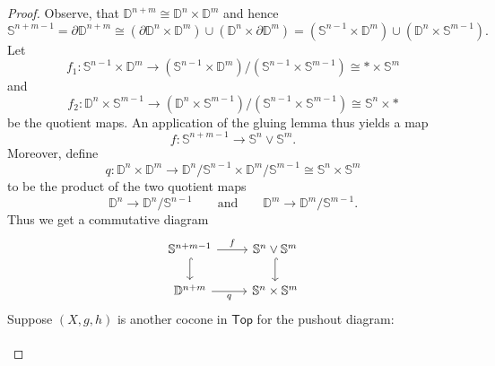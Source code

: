 \begin{proof}
	Observe, that $\mathbb{D}^{n + m} \cong \mathbb{D}^n \times \mathbb{D}^m$ and hence
	\begin{equation*}
		\mathbb{S}^{n + m - 1} = \partial \mathbb{D}^{n + m} \cong (\partial \mathbb{D}^n \times \mathbb{D}^m) \cup (\mathbb{D}^n \times \partial \mathbb{D}^m) = (\mathbb{S}^{n - 1} \times \mathbb{D}^m) \cup (\mathbb{D}^n \times \mathbb{S}^{m - 1}).
	\end{equation*}
	Let 
	\begin{equation*}
		f_1 : \mathbb{S}^{n - 1} \times \mathbb{D}^m \to (\mathbb{S}^{n - 1} \times \mathbb{D}^m) / (\mathbb{S}^{n - 1} \times \mathbb{S}^{m - 1}) \cong \ast \times \mathbb{S}^m
	\end{equation*}
	\noindent and
	\begin{equation*}
		f_2 : \mathbb{D}^n \times \mathbb{S}^{m - 1} \to (\mathbb{D}^n \times \mathbb{S}^{m - 1}) / (\mathbb{S}^{n - 1} \times \mathbb{S}^{m - 1}) \cong \mathbb{S}^n \times \ast
	\end{equation*}
	\noindent be the quotient maps. An application of the gluing lemma thus yields a map
	\begin{equation*}
		f : \mathbb{S}^{n + m - 1} \to \mathbb{S}^n \vee \mathbb{S}^m.
	\end{equation*}
	Moreover, define 
	\begin{equation*}
		q : \mathbb{D}^n \times \mathbb{D}^m \to \mathbb{D}^n/\mathbb{S}^{n - 1} \times \mathbb{D}^m/\mathbb{S}^{m - 1} \cong \mathbb{S}^n \times \mathbb{S}^m	
	\end{equation*}
	\noindent to be the product of the two quotient maps
	\begin{equation*}
		\mathbb{D}^n \to \mathbb{D}^n/\mathbb{S}^{n - 1} \qquad \text{and} \qquad \mathbb{D}^m \to \mathbb{D}^m/\mathbb{S}^{m - 1}.
	\end{equation*}
	Thus we get a commutative diagram
	\begin{equation*}
		\begin{tikzcd}
			\mathbb{S}^{n + m - 1} \arrow[r,"f"]\arrow[d,hook] & \mathbb{S}^n \vee \mathbb{S}^m \arrow[d,hook]\\
			\mathbb{D}^{n + m} \arrow[r,"q"'] & \mathbb{S}^n \times \mathbb{S}^m
		\end{tikzcd}
	\end{equation*}
	Suppose $(X,g,h)$ is another cocone in $\mathsf{Top}$ for the pushout diagram:
	\begin{equation*}
		\begin{tikzcd}

\end{tikzcd}
\end{equation*}
\end{proof}
